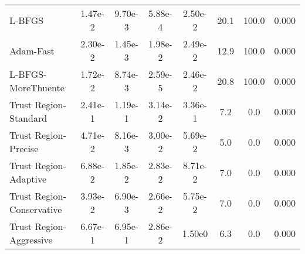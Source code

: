 \documentclass{article}
\begin{document}
\begin{table}[htbp]
{\begin{tabular}{p{2.5cm}*{7}{c}}
L-BFGS & 1.47e-2 & 9.70e-3 & 5.88e-4 & 2.50e-2 & 20.1 & 100.0 & 0.000 \\
Adam-Fast & 2.30e-2 & 1.45e-3 & 1.98e-2 & 2.49e-2 & 12.9 & 100.0 & 0.000 \\
L-BFGS-MoreThuente & 1.72e-2 & 8.74e-3 & 2.59e-5 & 2.46e-2 & 20.8 & 100.0 & 0.000 \\
Trust Region-Standard & 2.41e-1 & 1.19e-1 & 3.14e-2 & 3.36e-1 & 7.2 & 0.0 & 0.000 \\
Trust Region-Precise & 4.71e-2 & 8.16e-3 & 3.00e-2 & 5.69e-2 & 5.0 & 0.0 & 0.000 \\
Trust Region-Adaptive & 6.88e-2 & 1.85e-2 & 2.83e-2 & 8.71e-2 & 7.0 & 0.0 & 0.000 \\
Trust Region-Conservative & 3.93e-2 & 6.90e-3 & 2.66e-2 & 5.75e-2 & 7.0 & 0.0 & 0.000 \\
Trust Region-Aggressive & 6.67e-1 & 6.95e-1 & 2.86e-2 & 1.50e0 & 6.3 & 0.0 & 0.000 \\
\bottomrule
\end{tabular}
}
\end{table}
\end{document}
